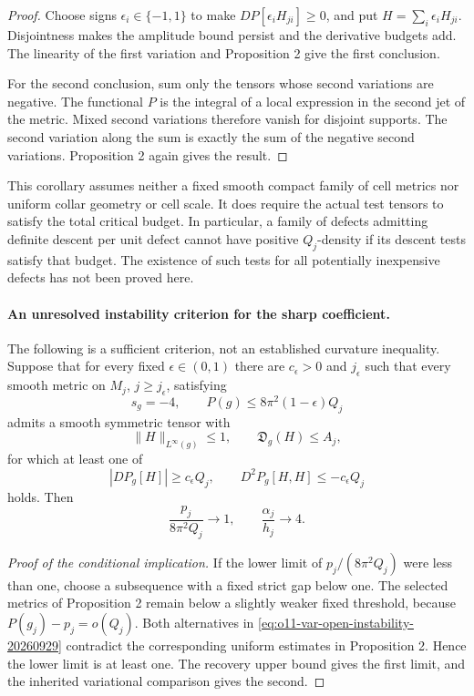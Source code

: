 \documentclass[11pt]{article}
\begin{document}
\begin{proof}
Choose signs $\epsilon_i\in\{-1,1\}$ to make
$DP[\epsilon_iH_{ji}]\ge0$, and put $H=\sum_i\epsilon_iH_{ji}$.
Disjointness makes the amplitude bound persist and the derivative
budgets add. The linearity of the first variation and Proposition 2 give
the first conclusion.

For the second conclusion, sum only the tensors whose second variations
are negative. The functional $P$ is the integral of a local expression
in the second jet of the metric. Mixed second variations therefore
vanish for disjoint supports. The second variation along the sum is
exactly the sum of the negative second variations. Proposition 2 again
gives the result.
\end{proof}

This corollary assumes neither a fixed smooth compact family of cell
metrics nor uniform collar geometry or cell scale. It does require the
actual test tensors to satisfy the total critical budget. In particular,
a family of defects admitting definite descent per unit defect cannot
have positive $Q_j$-density if its descent tests satisfy that budget.
The existence of such tests for all potentially inexpensive defects has
not been proved here.

\paragraph{An unresolved instability criterion for the sharp coefficient.}
The following is a sufficient criterion, not an established curvature
inequality. Suppose that for every fixed $\epsilon\in(0,1)$ there are
$c_\epsilon>0$ and $j_\epsilon$ such that every smooth metric on $M_j$,
$j\ge j_\epsilon$, satisfying
\[
 s_g=-4,\qquad P(g)\le8\pi^2(1-\epsilon)Q_j
\]
admits a smooth symmetric tensor with
\[
 \|H\|_{L^\infty(g)}\le1,\qquad \mathfrak D_g(H)\le A_j,
\]
for which at least one of
\begin{equation}
 |DP_g[H]|\ge c_\epsilon Q_j,
 \qquad
 D^2P_g[H,H]\le-c_\epsilon Q_j
 \label{eq:o11-var-open-instability-20260929}
\end{equation}
holds. Then
\[
 \frac{p_j}{8\pi^2Q_j}\longrightarrow1,
 \qquad \frac{\alpha_j}{h_j}\longrightarrow4.
\]

\begin{proof}[Proof of the conditional implication]
If the lower limit of $p_j/(8\pi^2Q_j)$ were less than one, choose a
subsequence with a fixed strict gap below one. The selected metrics of
Proposition 2 remain below a slightly weaker fixed threshold, because
$P(g_j)-p_j=o(Q_j)$. Both alternatives in
\eqref{eq:o11-var-open-instability-20260929} contradict the corresponding
uniform estimates in Proposition 2. Hence the lower limit is at least
one. The recovery upper bound gives the first limit, and the inherited
variational comparison gives the second.
\end{proof}
\end{document}
